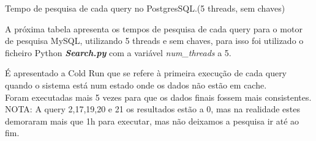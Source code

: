 \documentclass{article}
\begin{document}
\begin{table}[H]
    \caption{Tempo de pesquisa de cada query no PostgresSQL.(5 threads, sem chaves)}
    \label{tab:BC_Table3}
  \end{table}
\clearpage

\texttt{}\par A próxima tabela apresenta os tempos de pesquisa de cada query para o motor de pesquisa MySQL, utilizando 5 threads e sem chaves, para isso foi utilizado o ficheiro Python \textbf{\textit{Search.py}}  com a variável \textit{num\_threads} a 5. 
\texttt{}\par É apresentado a Cold Run que se refere à primeira execução de cada query quando o sistema está num estado onde os dados não estão em cache.\\
Foram executadas mais 5 vezes para que os dados finais fossem mais consistentes.\\
NOTA: A query 2,17,19,20 e 21 os resultados estão a 0, mas na realidade estes demoraram mais que 1h para executar, mas não deixamos a pesquisa ir até ao fim.
\end{document}
